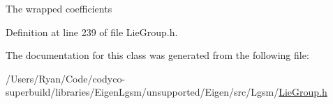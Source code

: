 The wrapped coefficients 

Definition at line 239 of file Lie\+Group.\+h.



The documentation for this class was generated from the following file\+:\begin{DoxyCompactItemize}
\item 
/\+Users/\+Ryan/\+Code/codyco-\/superbuild/libraries/\+Eigen\+Lgsm/unsupported/\+Eigen/src/\+Lgsm/\hyperlink{_lie_group_8h}{Lie\+Group.\+h}\end{DoxyCompactItemize}
